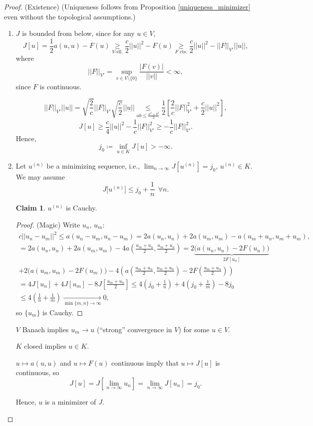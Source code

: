 \documentclass[12pt]{article}
\theoremstyle{definition}
\newtheorem*{claim*}{Claim}
\begin{document}
\begin{proof}
(Existence) (Uniqueness follows from Proposition \ref{uniqueness_minimizer} even without the topological assumptions.)

\begin{enumerate}[label=\arabic*.]
\item $J$ is bounded from below, since for any $u\in V$,
\[J[u]=\frac12a(u,u)-F(u)\underset{V\text{-ell.}}\geq\frac c2||u||^2-F(u)\underset{F\text{ cts.}}\geq\frac c2||u||^2-||F||_{V'}||u||,\]
where
\[||F||_{V'}=\sup_{v\in V\setminus\{0\}}\frac{|F(v)|}{||v||}<\infty,\]
since $F$ is continuous.

\[||F||_{V'}||u||=\sqrt{\frac2c}||F||_{V'}\sqrt{\frac c2}||u||\underset{ab\leq\frac{a^2+b^2}2}\leq\frac12\left[\frac2c||F||_{V'}^2+\frac c2||u||^2\right],\]
\[J[u]\geq\frac c4||u||^2-\frac1c||F||_{V'}^2\geq-\frac1c||F||_{V'}^2.\]
Hence,
\[j_0\coloneqq\inf_{u\in K}J[u]>-\infty.\]

\item Let $u^{(n)}$ be a minimizing sequence, i.e., $\lim_{n\to\infty}J[u^{(n)}]=j_0$, $u^{(n)}\in K$. We may assume
\[J\big[u^{(n)}\big]\leq j_0+\frac1n\ \ \forall n.\]

\begin{claim*}
$u^{(n)}$ is Cauchy.
\end{claim*}

\begin{proof}
(Magic) Write $u_n$, $u_m$:
\begin{multline*}
c||u_n-u_m||^2\leq a(u_n-u_m,u_n-u_m)=2a(u_n,u_n)+2a(u_m,u_m)-a(u_m+u_n,u_m+u_m),\\
=2a(u_n,u_n)+2a(u_m,u_m)-4a\left(\frac{u_m+u_n}2,\frac{u_m+u_n}2\right)=2\underbrace{\big(a(u_n,u_n)-2F(u_n)\big)}_{2F[u_n]}\\
+2\big(a(u_m,u_m)-2F(u_m)\big)-4\left(a\left(\frac{u_m+u_n}2,\frac{u_m+u_n}2\right)-2F\left(\frac{u_m+u_n}2\right)\right)\\
=4J[u_n]+4J[u_m]-8J\left[\frac{u_m+u_n}2\right]\leq4\left(j_0+\frac1n\right)+4\left(j_0+\frac1m\right)-8j_0\\
\leq4\left(\frac1n+\frac1m\right)\xrightarrow[\min\{m,n\}\to\infty]{}0,
\end{multline*}
so $\{u_m\}$ is Cauchy.
\end{proof}
$V$ Banach implies $u_m\rightarrow u$ (``strong'' convergence in $V$) for some $u\in V$.

$K$ closed implies $u\in K$.

$u\mapsto a(u,u)$ and $u\mapsto F(u)$ continuous imply that $u\mapsto J[u]$ is continuous, so
\[J[u]=J\left[\lim_{n\to\infty}u_n\right]=\lim_{n\to\infty}J[u_n]=j_0.\]

Hence, $u$ is a minimizer of $J$.
\end{enumerate}
\end{proof}
\end{document}
